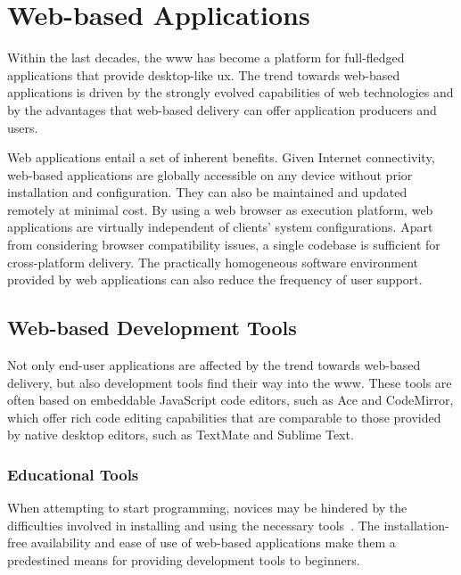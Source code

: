 \section{Web-based Applications}\label{section:web-based-applications}

Within the last decades, the \gls{www} has become a platform for full-fledged applications that provide desktop-like \gls{ux}. The trend towards web-based applications is driven by the strongly evolved capabilities of web technologies and by the advantages that web-based delivery can offer application producers and users.

Web applications entail a set of inherent benefits. Given Internet connectivity, web-based applications are globally accessible on any device without prior installation and configuration. They can also be maintained and updated remotely at minimal cost. By using a web browser as execution platform, web applications are virtually independent of clients' system configurations. Apart from considering browser compatibility issues, a single codebase is sufficient for cross-platform delivery. The practically homogeneous software environment provided by web applications can also reduce the frequency of user support.

\subsection{Web-based Development Tools}\label{section:web-based-development-tools}

Not only end-user applications are affected by the trend towards web-based delivery, but also development tools find their way into the \gls{www}. These tools are often based on embeddable JavaScript code editors, such as Ace and CodeMirror, which offer rich code editing capabilities that are comparable to those provided by native desktop editors, such as TextMate and Sublime Text.

\subsubsection{Educational Tools}

When attempting to start programming, novices may be hindered by the difficulties involved in installing and using the necessary tools~\cite{truong2005learning}. The installation-free availability and ease of use of web-based applications make them a predestined means for providing development tools to beginners.

